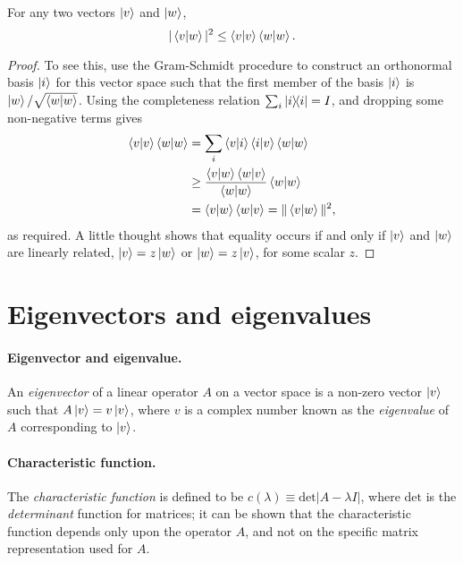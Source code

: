 \begin{theorem}
  For any two vectors $\ket{v}$ and $\ket{w}$, \begin{equation}
    |\braket{v}{w}|^2 \leq \braket{v}{v}\braket{w}{w}. \label{eq:cau-sch-ine}
  \end{equation}
\end{theorem}
\begin{proof}
  To see this, use the Gram-Schmidt procedure to construct an orthonormal basis
  $\ket{i}$ for this vector space such that the first member of the basis
  $\ket{i}$ is $\ket{w}/\sqrt{\braket{w}{w}}$. Using the completeness relation
  $\sum_i \ketbra{i}{i} = I$, and dropping some non-negative terms gives
  \begin{align*}
    \braket{v}{v}\braket{w}{w}
      &= \sum_i \braket{v}{i}\braket{i}{v} \braket{w}{w} \\
      &\geq \frac{\braket{v}{w}\braket{w}{v}}{\braket{w}{w}} \braket{w}{w} \\
      &= \braket{v}{w}\braket{w}{v} = \|\braket{v}{w}\|^2,
  \end{align*} as required. A little thought shows that equality occurs if and
  only if $\ket{v}$ and $\ket{w}$ are linearly related, $\ket{v} = z\ket{w}$ or
  $\ket{w} = z\ket{v}$, for some scalar $z$.
\end{proof}

\section{Eigenvectors and eigenvalues}

\paragraph{Eigenvector and eigenvalue.} An \emph{eigenvector} of a linear
operator $A$ on a vector space is a non-zero vector $\ket{v}$ such that
$A\ket{v} = v\ket{v}$, where $v$ is a complex number known as the
\emph{eigenvalue} of $A$ corresponding to $\ket{v}$.

\paragraph{Characteristic function.} The \emph{characteristic function} is
defined to be $c(\lambda) \equiv \text{det} |A - \lambda I|$, where
$\text{det}$ is the \emph{determinant} function for matrices; it can be shown
that the characteristic function depends only upon the operator $A$, and not on
the specific matrix representation used for $A$.

